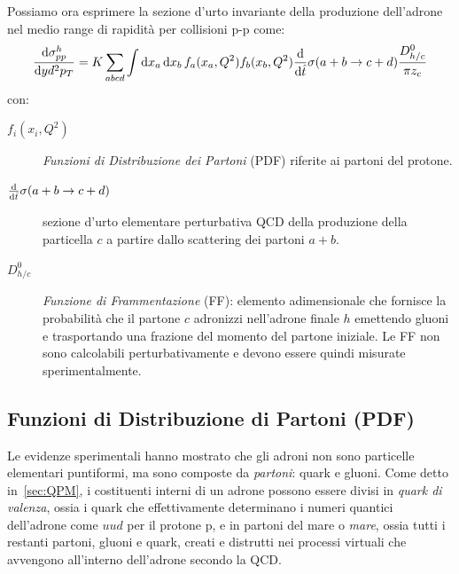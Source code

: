     Possiamo ora esprimere la sezione d'urto invariante della produzione dell'adrone nel medio range di rapidità per collisioni p-p come:
    \begin{equation*}
        \dv{\sigma_{pp}^h}{y d^2 p_T} = K \sum_{abcd}{ \int{ \dd{x_a} \dd{x_b} f_{a}(x_a,Q^2) f_{b}(x_b,Q^2) \dv{\hat{t}} \sigma(a + b \to c + d) \frac{D_{{h}/{c}}^0}{\pi z_c}}}
    \end{equation*}
    con:
    \begin{description}
        \item[$f_i(x_i,Q^2)$] \textit{Funzioni di Distribuzione dei Partoni} (PDF) riferite ai partoni del protone.

        \item[$\dv{\hat{t}} \sigma(a + b \to c + d)$] sezione d'urto elementare perturbativa QCD della produzione della particella $c$ a partire dallo scattering dei partoni $a + b$.

        \item[$D_{{h}/{c}}^0$] \textit{Funzione di Frammentazione} (FF): elemento adimensionale che fornisce la probabilità che il partone $c$ adronizzi nell'adrone finale $h$ emettendo gluoni e trasportando una frazione del momento del partone iniziale. Le FF non sono calcolabili perturbativamente e devono essere quindi misurate sperimentalmente.
    \end{description}

    \subsection{Funzioni di Distribuzione di Partoni (PDF)}
        Le evidenze sperimentali hanno mostrato che gli adroni non sono particelle elementari puntiformi, ma sono composte da \textit{partoni}: quark e gluoni. Come detto in~\ref{sec:QPM}, i costituenti interni di un adrone possono essere divisi in \textit{quark di valenza}, ossia i quark che effettivamente determinano i numeri quantici dell'adrone come $uud$ per il protone p, e in partoni del mare o \textit{mare}, ossia tutti i restanti partoni, gluoni e quark, creati e distrutti nei processi virtuali che avvengono all'interno dell'adrone secondo la QCD.

